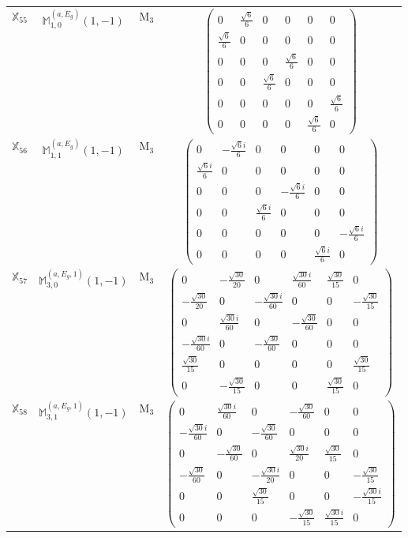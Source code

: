 \documentclass[fleqn,10pt,landscape]{article}
\begin{document}
\begin{itemize}
\begin{center}
\begin{longtable}{c|c|c|c}
$ \mathbb{X}_{55} $ & $\mathbb{M}_{1,0}^{(a,E_{g})}(1,-1)$ & M$_{3}$ & $\begin{pmatrix} 0 & \frac{\sqrt{6}}{6} & 0 & 0 & 0 & 0 \\ \frac{\sqrt{6}}{6} & 0 & 0 & 0 & 0 & 0 \\ 0 & 0 & 0 & \frac{\sqrt{6}}{6} & 0 & 0 \\ 0 & 0 & \frac{\sqrt{6}}{6} & 0 & 0 & 0 \\ 0 & 0 & 0 & 0 & 0 & \frac{\sqrt{6}}{6} \\ 0 & 0 & 0 & 0 & \frac{\sqrt{6}}{6} & 0 \end{pmatrix}$ \\
$ \mathbb{X}_{56} $ & $\mathbb{M}_{1,1}^{(a,E_{g})}(1,-1)$ & M$_{3}$ & $\begin{pmatrix} 0 & - \frac{\sqrt{6} i}{6} & 0 & 0 & 0 & 0 \\ \frac{\sqrt{6} i}{6} & 0 & 0 & 0 & 0 & 0 \\ 0 & 0 & 0 & - \frac{\sqrt{6} i}{6} & 0 & 0 \\ 0 & 0 & \frac{\sqrt{6} i}{6} & 0 & 0 & 0 \\ 0 & 0 & 0 & 0 & 0 & - \frac{\sqrt{6} i}{6} \\ 0 & 0 & 0 & 0 & \frac{\sqrt{6} i}{6} & 0 \end{pmatrix}$ \\
$ \mathbb{X}_{57} $ & $\mathbb{M}_{3,0}^{(a,E_{g},1)}(1,-1)$ & M$_{3}$ & $\begin{pmatrix} 0 & - \frac{\sqrt{30}}{20} & 0 & \frac{\sqrt{30} i}{60} & \frac{\sqrt{30}}{15} & 0 \\ - \frac{\sqrt{30}}{20} & 0 & - \frac{\sqrt{30} i}{60} & 0 & 0 & - \frac{\sqrt{30}}{15} \\ 0 & \frac{\sqrt{30} i}{60} & 0 & - \frac{\sqrt{30}}{60} & 0 & 0 \\ - \frac{\sqrt{30} i}{60} & 0 & - \frac{\sqrt{30}}{60} & 0 & 0 & 0 \\ \frac{\sqrt{30}}{15} & 0 & 0 & 0 & 0 & \frac{\sqrt{30}}{15} \\ 0 & - \frac{\sqrt{30}}{15} & 0 & 0 & \frac{\sqrt{30}}{15} & 0 \end{pmatrix}$ \\
$ \mathbb{X}_{58} $ & $\mathbb{M}_{3,1}^{(a,E_{g},1)}(1,-1)$ & M$_{3}$ & $\begin{pmatrix} 0 & \frac{\sqrt{30} i}{60} & 0 & - \frac{\sqrt{30}}{60} & 0 & 0 \\ - \frac{\sqrt{30} i}{60} & 0 & - \frac{\sqrt{30}}{60} & 0 & 0 & 0 \\ 0 & - \frac{\sqrt{30}}{60} & 0 & \frac{\sqrt{30} i}{20} & \frac{\sqrt{30}}{15} & 0 \\ - \frac{\sqrt{30}}{60} & 0 & - \frac{\sqrt{30} i}{20} & 0 & 0 & - \frac{\sqrt{30}}{15} \\ 0 & 0 & \frac{\sqrt{30}}{15} & 0 & 0 & - \frac{\sqrt{30} i}{15} \\ 0 & 0 & 0 & - \frac{\sqrt{30}}{15} & \frac{\sqrt{30} i}{15} & 0 \end{pmatrix}$ \\

\end{longtable}
\end{center}
\end{itemize}
\end{document}
